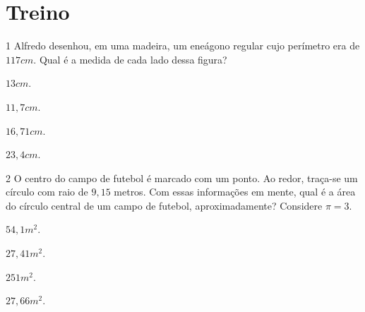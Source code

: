 \section*{Treino}

\num{1} Alfredo desenhou, em uma madeira, um eneágono regular cujo perímetro
era de $117 cm$. Qual é a medida de cada lado dessa figura?


\begin{escolha}[itemsep=0pt]
\item $13 cm$.
\item $11,7 cm$.
\item $16,71 cm$.
\item $23,4 cm$.
\end{escolha}







\num{2} O centro do campo de futebol é marcado com um ponto. Ao redor,
traça-se um círculo com raio de $9,15$ metros. Com essas informações em
mente, qual é a área do círculo central de um campo de futebol,
aproximadamente? Considere $\pi = 3$.

\begin{escolha}[itemsep=0pt]
\item $54,1 m^2$.
\item $27,41 m^2$.
\item $251 m^2$.
\item $27,66 m^2$.
\end{escolha}


